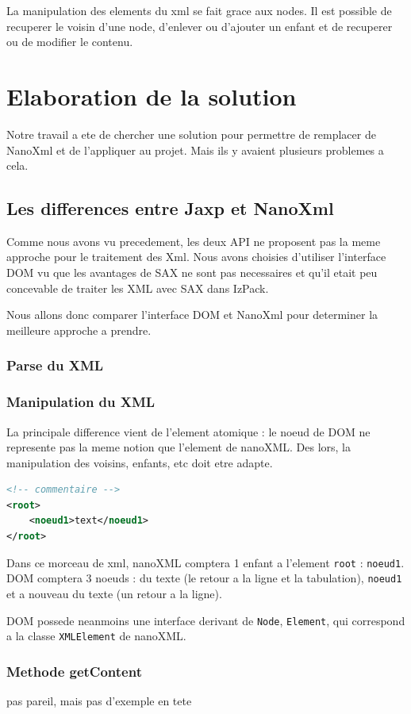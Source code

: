 La manipulation des elements du xml se fait grace aux nodes. Il est possible de recuperer le voisin d'une node, d'enlever ou d'ajouter un enfant et de recuperer ou de modifier le contenu.
\section{Elaboration de la solution}
Notre travail a ete de chercher une solution pour permettre de remplacer de NanoXml et de l'appliquer au projet. Mais ils y avaient plusieurs problemes a cela.
\subsection{Les differences entre Jaxp et NanoXml}
Comme nous avons vu precedement, les deux API ne proposent pas la meme approche pour le traitement des Xml. Nous avons choisies d'utiliser l'interface DOM vu que les avantages de SAX ne sont pas necessaires et qu'il etait peu concevable de traiter les XML avec SAX dans IzPack.

Nous allons donc comparer l'interface DOM et NanoXml pour determiner la meilleure approche a prendre.
\subsubsection{Parse du XML}

\subsubsection{Manipulation du XML}
La principale difference vient de l'element atomique : le noeud de DOM ne represente pas la meme notion que l'element de nanoXML. Des lors, la manipulation des voisins, enfants, etc doit etre adapte.
\begin{lstlisting}[language=xml]
<!-- commentaire -->
<root>
	<noeud1>text</noeud1>
</root>
\end{lstlisting}
Dans ce morceau de xml, nanoXML comptera 1 enfant a l'element \verb|root| : \verb|noeud1|. DOM comptera 3 noeuds : du texte (le retour a la ligne et la tabulation), \verb|noeud1| et a nouveau du texte (un retour a la ligne).

DOM possede neanmoins une interface derivant de \verb|Node|, \verb|Element|, qui correspond a la classe \verb|XMLElement| de nanoXML.

\subsubsection{Methode getContent}
pas pareil, mais pas d'exemple en tete
